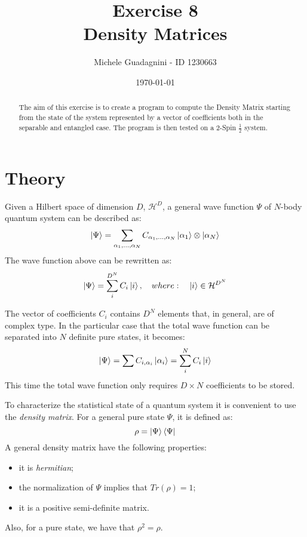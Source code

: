 \documentclass[11pt,a4paper]{article}
\author{Michele Guadagnini - ID 1230663}
\title{\textbf{Exercise 8 \\ Density Matrices}}
\date{\today}
\begin{document}
\maketitle

\vspace{20pt}
\begin{abstract}
		The aim of this exercise is to create a program to compute the Density Matrix starting from the state of the system represented by a vector of coefficients both in the separable and entangled case. The program is then tested on a 2-Spin $\frac{1}{2}$ system.
\end{abstract}

\section{Theory} %


Given a Hilbert space of dimension $D$, $\mathcal{H}^D$, a general wave function $\Psi$ of $N$-body quantum system can be described as:
\begin{equation}
 \ket{\Psi} = \sum_{\alpha_1,...,\alpha_N} C_{\alpha_1,...,\alpha_N} \ket{\alpha_1} \otimes \ket{\alpha_N}
 \label{eq:GenPsi1}
\end{equation}
The wave function above can be rewritten as:
\begin{equation}
 \ket{\Psi} = \sum_{i}^{D^N} C_i \ket{i}, \quad where: \quad \ket{i} \in \mathcal{H}^{D^N}
 \label{eq:GenPsi2}
\end{equation}

The vector of coefficients $C_i$ contains $D^N$ elements that, in general, are of complex type.
In the particular case that the total wave function can be separated into $N$ definite pure states, it becomes:
\begin{equation}
 \ket{\Psi} = \sum C_{i, \alpha_i} \ket{\alpha_i} = \sum_{i}^{N} C_i \ket{i}
 \label{eq:SepPsi}
\end{equation}
This time the total wave function only requires $D\times N$ coefficients to be stored.

To characterize the statistical state of a quantum system it is convenient to use the \textit{density matrix}. For a general pure state $\Psi$, it is defined as:
\begin{equation}
 \rho = \ket{\Psi} \bra{\Psi}
 \label{eq:GenRho}
\end{equation}
A general density matrix have the following properties:
\begin{itemize}
	\item it is \textit{hermitian};
	\item the normalization of $\Psi$ implies that $Tr(\rho) = 1$;
	\item it is a positive semi-definite matrix.
\end{itemize}
Also, for a pure state, we have that $\rho^2 = \rho$.
\end{document}
